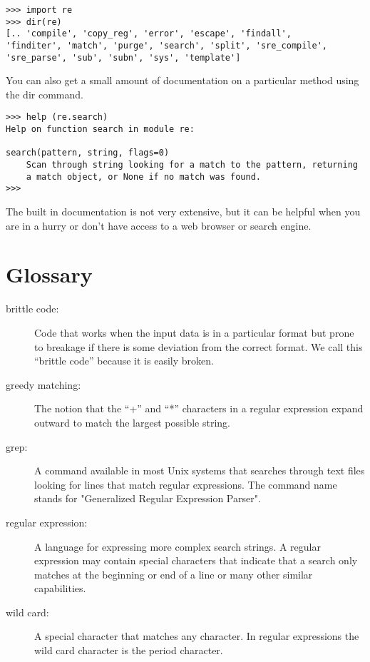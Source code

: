 \beforeverb
\begin{verbatim}
>>> import re
>>> dir(re)
[.. 'compile', 'copy_reg', 'error', 'escape', 'findall', 
'finditer', 'match', 'purge', 'search', 'split', 'sre_compile', 
'sre_parse', 'sub', 'subn', 'sys', 'template']
\end{verbatim}
\afterverb
%
You can also get a small amount of documentation on a particular method using the dir command.

\beforeverb
\begin{verbatim}
>>> help (re.search)
Help on function search in module re:

search(pattern, string, flags=0)
    Scan through string looking for a match to the pattern, returning
    a match object, or None if no match was found.
>>> 
\end{verbatim}
\afterverb
%
The built in documentation is not very extensive, but it can be helpful when you are in a hurry
or don't have access to a web browser or search engine.

\section{Glossary}

\begin{description}

\item[brittle code:]
Code that works when the input data is in a particular format but prone to breakage
if there is some deviation from the correct format.  We call this ``brittle code'' 
because it is easily broken.

\item[greedy matching:]
The notion that the ``+'' and ``*'' characters in a regular expression expand outward to match the largest possible string.

\item[grep:]
A command available in most Unix systems that searches through text files looking for lines that match regular expressions.  The command name stands for "Generalized Regular Expression Parser".

\item[regular expression:]
A language for expressing more complex search strings.  A regular expression may contain special characters that indicate that a search only matches at the beginning or end of a line or many other similar capabilities.

\item[wild card:]
A special character that matches any character.   In regular expressions the wild card character is the period character.

\end{description}

